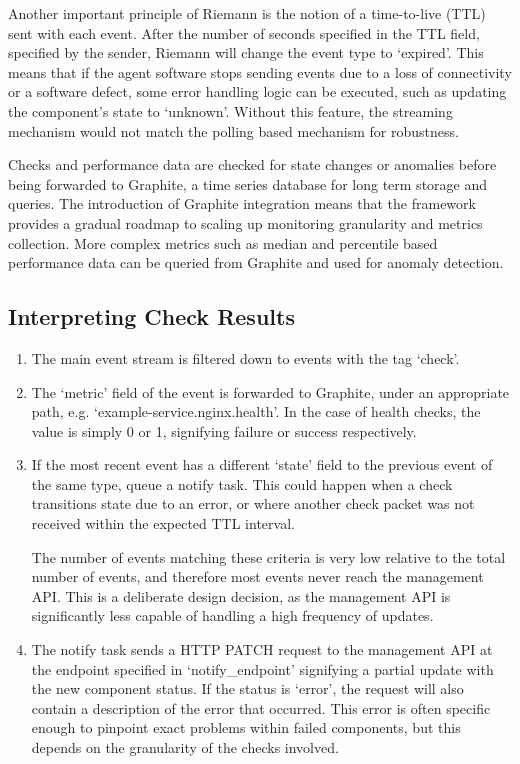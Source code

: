\documentclass{cshonours}
\begin{document}
Another important principle of Riemann is the notion of a time-to-live (TTL) sent with each event. After the number of seconds specified in the TTL field, specified by the sender, Riemann will change the event type to `expired'. This means that if the agent software stops sending events due to a loss of connectivity or a software defect, some error handling logic can be executed, such as updating the component's state to `unknown'. Without this feature, the streaming mechanism would not match the polling based mechanism for robustness.

Checks and performance data are checked for state changes or anomalies before being forwarded to Graphite, a time series database for long term storage and queries. The introduction of Graphite integration means that the framework provides a gradual roadmap to scaling up monitoring granularity and metrics collection. More complex metrics such as median and percentile based performance data can be queried from Graphite and used for anomaly detection.

\subsection{Interpreting Check Results}

\begin{enumerate}
  \item The main event stream is filtered down to events with the tag `check'.
  \item The `metric' field of the event is forwarded to Graphite, under an appropriate path, e.g. `example-service.nginx.health'. In the case of health checks, the value is simply 0 or 1, signifying failure or success respectively.
  \item If the most recent event has a different `state' field to the previous event of the same type, queue a notify task. This could happen when a check transitions state due to an error, or where another check packet was not received within the expected TTL interval.

    The number of events matching these criteria is very low relative to the total number of events, and therefore most events never reach the management API. This is a deliberate design decision, as the management API is significantly less capable of handling a high frequency of updates.
  \item The notify task sends a HTTP PATCH request to the management API at the endpoint specified in `notify\_endpoint' signifying a partial update with the new component status. If the status is `error', the request will also contain a description of the error that occurred. This error is often specific enough to pinpoint exact problems within failed components, but this depends on the granularity of the checks involved.
\end{enumerate}
\end{document}
